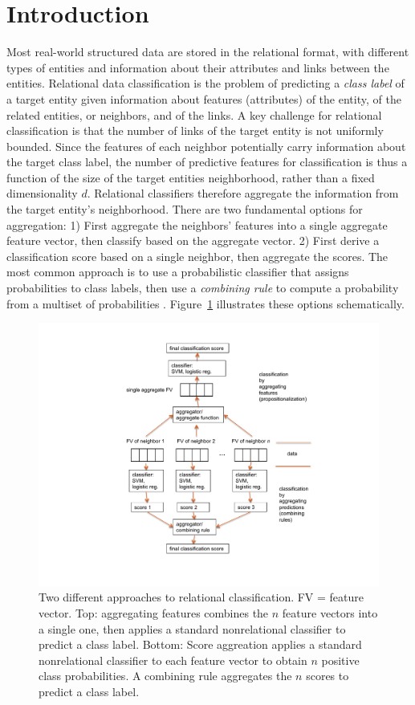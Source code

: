\documentclass[conference]{IEEEtran}
\begin{document}
\section{Introduction}
Most real-world structured data are stored in the relational format, with different types of entities and information about their attributes and links between the entities.
Relational data classification is the problem of predicting a {\em class label} of a target entity given information about features (attributes) of the entity, of the related entities, or neighbors, and of the links.
A key challenge for relational classification is that the number of links of the target entity is not uniformly bounded. Since the features of each neighbor potentially carry information about the target class label, the number of predictive features for classification is thus a function of the size of the target entities neighborhood, rather than a fixed dimensionality $d$. Relational classifiers therefore aggregate the information from the target entity's neighborhood. There are two fundamental options for aggregation: 1) First aggregate the neighbors' features into a single aggregate feature vector, then classify based on the aggregate vector. 2) First derive a classification score based on a single neighbor, then aggregate the scores. The most common approach is to use a probabilistic classifier that assigns probabilities to class labels, then use a {\em combining rule} to compute a probability from a multiset of probabilities \cite{Pearl1988,Kersting2007}.
%
Figure~\ref{fig:classify} illustrates these options schematically.
\begin{figure}[htbp]
\begin{center}
\includegraphics[width = 0.5 \textwidth]{classify}
\caption{Two different approaches to relational classification. FV = feature vector. Top: aggregating features combines the $n$ feature vectors into a single one, then applies a standard nonrelational classifier to predict a class label. Bottom: Score aggreation applies a standard nonrelational classifier to each feature vector to obtain $n$ positive class probabilities. A combining rule aggregates the $n$ scores to predict a class label.}
\label{fig:classify}
\end{center}
\end{figure}
\end{document}
